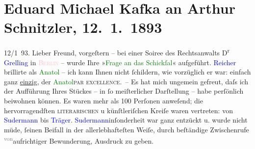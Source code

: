 

               \section[Eduard Michael Kafka an Arthur Schnitzler, 12. 1. 1893]{ Eduard Michael Kafka an Arthur Schnitzler, 12. 1. 1893}\nopagebreak{}\rehead{ }\normalsize\beginnumbering{} \toendnotes[C]{\smallbreak\pagebreak[2]} 
\toendnotes[C]{\smallbreak}\pstart
           \raggedleft{}{\pb}12/1 93.\pend
           \pstart{}Lieber Freund,\pend\pstart
           vorgeſtern – bei einer Soiree des Rechtsanwalts D\textsuperscript{r}{ }\textcolor{blue}{Grelling}{}\ledrightnote{\textcolor{blue}{Richard Grelling}} in \textcolor{pink}{\textsc{Berlin}}{}\ledrightnote{\textcolor{pink}{Berlin}} – wurde Ihre »\textcolor{green}{Frage an das Schickſal}{}\ledrightnote{\textcolor{green}{Die Frage an das Schicksal}}«
                    aufgeführt. \textcolor{blue}{Reicher}{}\ledrightnote{\textcolor{blue}{Emanuel Reicher}} brillirte als \textcolor{green}{Anatol}{}\ledrightnote{\textcolor{green}{Anatol}} – ich kann Ihnen nicht ſchildern, wie
                    vorzüglich er war: einfach ganz \uline{einzig}, der \textcolor{green}{Anatol}{}\ledrightnote{\textcolor{green}{Anatol}}{ }\textsc{par excellence}. – Es hat mich ungemein gefreut, daſs
                    ich der Aufführung Ihres Stückes – in ſo meiſterlicher Darſtellung – habe
                    perſönlich beiwohnen können. Es waren mehr {\pb}als 100 Perſonen anweſend; die
                    hervorragendſten \textsc{literarischen} u künſtleriſchen Kreiſe
                    waren vertreten: von \textcolor{blue}{Sudermann}{}\ledrightnote{\textcolor{blue}{Hermann Sudermann}} bis \textcolor{blue}{Träger}{}\ledrightnote{\textcolor{blue}{Albert Traeger}}. \textcolor{blue}{Sudermann}{}\ledrightnote{\textcolor{blue}{Hermann Sudermann}}\introOben{}inſonderheit\introOben{} war ganz entzückt u. wurde nicht müde,
                    ſeinen Beifall in der allerlebhafteſten Weiſe, durch beſtändige Zwischenrufe \substVorne{}\textsuperscript{\textcolor{gray}{von}}\substDazwischen{}aufrichtiger\substHinten{} Bewunderung, Ausdruck zu geben.\pend
